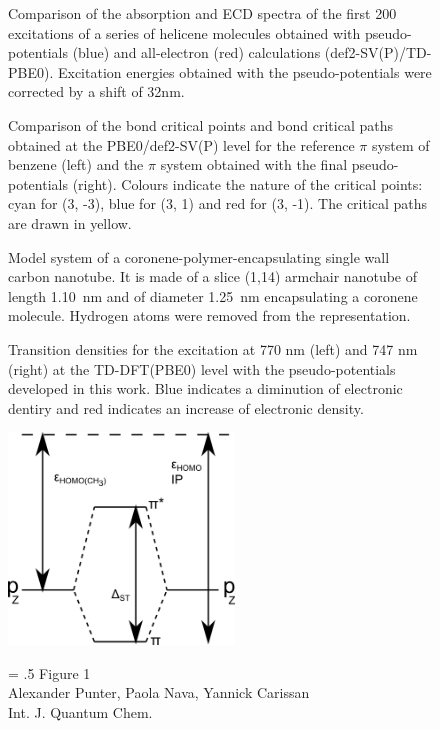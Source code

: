 \documentclass[12pt]{article}
\begin{document}
\begin{figure}
\caption{Comparison of the absorption and ECD spectra of the first 200 excitations of a series of helicene molecules obtained with pseudo-potentials (blue) and all-electron (red) calculations (def2-SV(P)/TD-PBE0). 
Excitation energies obtained with the pseudo-potentials were corrected by a shift of 32nm.}
\label{fig:helicene_spectra}
\end{figure}

\begin{figure}
\caption{Comparison of the bond critical points and bond critical paths obtained at the PBE0/def2-SV(P)
level for the
reference $\pi$ system of benzene (left) and the $\pi$ system obtained with the final pseudo-potentials (right).
Colours indicate the nature of the critical points: cyan for (3, -3), blue for (3, 1) and red for (3, -1).
The critical paths are drawn in yellow.}
\label{fig:aim_c6h6}
\end{figure}

\begin{figure}	
\caption{Model system of a coronene-polymer-encapsulating single wall carbon nanotube.	
It is made of a slice (1,14) armchair nanotube of length 1.10~nm and of	
diameter 1.25~nm encapsulating a coronene molecule.	
Hydrogen atoms were removed from the representation.	
}	
\label{fig:nanotube_model}	
\end{figure}	

 \begin{figure}	
\caption{Transition densities for the excitation at 770 nm (left) and 747 nm (right) 	
at the TD-DFT(PBE0) level with the pseudo-potentials developed in this work.	
Blue indicates a diminution of electronic dentiry and red indicates an increase of electronic density.	
}	
\label{fig:trans_55_59}	
\end{figure}

\clearpage

\begin{figure}
\begin{center}
\includegraphics[width=6cm]{diagram}
\end{center}
{\Large
\begin{minipage}[t]{3in}
\baselineskip = .5\baselineskip
Figure 1 \\
Alexander Punter, Paola Nava, Yannick Carissan\\
Int. J. Quantum Chem.
\end{minipage}
}
\end{figure}
\end{document}
